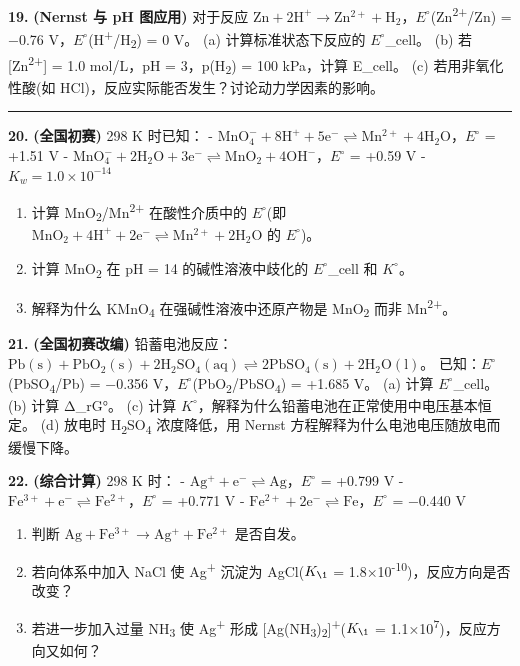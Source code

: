 \documentclass[a4paper,11pt]{ctexart}
\providecommand{\tightlist}{\setlength{\itemsep}{0pt}\setlength{\parskip}{0pt}}
\begin{document}
\textbf{19.} \textbf{(Nernst 与 pH 图应用)} 对于反应 \(\mathrm{Zn + 2H^+ \to Zn^{2+} + H_2}\)，\(E^{\circ}\)(Zn\textsuperscript{2+}/Zn) = −0.76 V，\(E^{\circ}\)(H\textsuperscript{+}/H\textsubscript{2}) = 0 V。
(a) 计算标准状态下反应的 \(E^{\circ}\)\_cell。
(b) 若 {[}Zn\textsuperscript{2+}{]} = 1.0 mol/L，pH = 3，p(H\textsubscript{2}) = 100 kPa，计算 E\_cell。
(c) 若用非氧化性酸(如 HCl)，反应实际能否发生？讨论动力学因素的影响。

\begin{center}\rule{0.5\linewidth}{0.5pt}\end{center}

\textbf{20.} \textbf{(全国初赛)} 298 K 时已知：
- \(\mathrm{MnO_4^- + 8H^+ + 5e^- \rightleftharpoons Mn^{2+} + 4H_2O}\)，\(E^{\circ}\) = +1.51 V
- \(\mathrm{MnO_4^- + 2H_2O + 3e^- \rightleftharpoons MnO_2 + 4OH^-}\)，\(E^{\circ}\) = +0.59 V
- \(K_w = 1.0 \times 10^{-14}\)

\begin{enumerate}
\def\labelenumi{(\alph{enumi})}
\tightlist
\item
  计算 MnO\textsubscript{2}/Mn\textsuperscript{2+} 在酸性介质中的 \(E^{\circ}\)(即 \(\mathrm{MnO_2 + 4H^+ + 2e^- \rightleftharpoons Mn^{2+} + 2H_2O}\) 的 \(E^{\circ}\))。
\item
  计算 MnO\textsubscript{2} 在 pH = 14 的碱性溶液中歧化的 \(E^{\circ}\)\_cell 和 \(K^{\circ}\)。
\item
  解释为什么 KMnO\textsubscript{4} 在强碱性溶液中还原产物是 MnO\textsubscript{2} 而非 Mn\textsuperscript{2+}。
\end{enumerate}

\textbf{21.} \textbf{(全国初赛改编)} 铅蓄电池反应：\(\mathrm{Pb(s) + PbO_2(s) + 2H_2SO_4(aq) \rightleftharpoons 2PbSO_4(s) + 2H_2O(l)}\)。
已知：\(E^{\circ}\)(PbSO\textsubscript{4}/Pb) = −0.356 V，\(E^{\circ}\)(PbO\textsubscript{2}/PbSO\textsubscript{4}) = +1.685 V。
(a) 计算 \(E^{\circ}\)\_cell。
(b) 计算 Δ\_rG°。
(c) 计算 \(K^{\circ}\)，解释为什么铅蓄电池在正常使用中电压基本恒定。
(d) 放电时 H\textsubscript{2}SO\textsubscript{4} 浓度降低，用 Nernst 方程解释为什么电池电压随放电而缓慢下降。

\textbf{22.} \textbf{(综合计算)} 298 K 时：
- \(\mathrm{Ag^+ + e^- \rightleftharpoons Ag}\)，\(E^{\circ}\) = +0.799 V
- \(\mathrm{Fe^{3+} + e^- \rightleftharpoons Fe^{2+}}\)，\(E^{\circ}\) = +0.771 V
- \(\mathrm{Fe^{2+} + 2e^- \rightleftharpoons Fe}\)，\(E^{\circ}\) = −0.440 V

\begin{enumerate}
\def\labelenumi{(\alph{enumi})}
\tightlist
\item
  判断 \(\mathrm{Ag + Fe^{3+} \to Ag^+ + Fe^{2+}}\) 是否自发。
\item
  若向体系中加入 NaCl 使 Ag\textsuperscript{+} 沉淀为 AgCl(\(K_{\1}\) = 1.8×10\textsuperscript{-10})，反应方向是否改变？
\item
  若进一步加入过量 NH\textsubscript{3} 使 Ag\textsuperscript{+} 形成 {[}Ag(NH\textsubscript{3})\textsubscript{2}{]}\textsuperscript{+}(\(K_{\1}\) = 1.1×10\textsuperscript{7})，反应方向又如何？
\end{enumerate}
\end{document}
